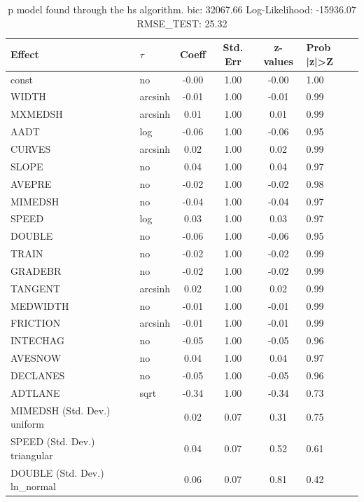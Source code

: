 \begin{table}
	\caption{p model found through the hs algorithm. bic: 32067.66 Log-Likelihood: -15936.07 RMSE_TEST: 25.32}
	\begin{center}
		\begin{tabular}{|l|l|c|c|c|l|}
			\hline
			Effect & $\tau$ & Coeff & Std. Err & z-values & Prob |z|>Z \\
			\hline
			const & no & -0.00 & 1.00 & -0.00 & 1.00 \\
			\hline
			WIDTH & arcsinh & -0.01 & 1.00 & -0.01 & 0.99 \\
			\hline
			MXMEDSH & arcsinh & 0.01 & 1.00 & 0.01 & 0.99 \\
			\hline
			AADT & log & -0.06 & 1.00 & -0.06 & 0.95 \\
			\hline
			CURVES & arcsinh & 0.02 & 1.00 & 0.02 & 0.99 \\
			\hline
			SLOPE & no & 0.04 & 1.00 & 0.04 & 0.97 \\
			\hline
			AVEPRE & no & -0.02 & 1.00 & -0.02 & 0.98 \\
			\hline
			MIMEDSH & no & -0.04 & 1.00 & -0.04 & 0.97 \\
			\hline
			SPEED & log & 0.03 & 1.00 & 0.03 & 0.97 \\
			\hline
			DOUBLE & no & -0.06 & 1.00 & -0.06 & 0.95 \\
			\hline
			TRAIN & no & -0.02 & 1.00 & -0.02 & 0.99 \\
			\hline
			GRADEBR & no & -0.02 & 1.00 & -0.02 & 0.99 \\
			\hline
			TANGENT & arcsinh & 0.02 & 1.00 & 0.02 & 0.99 \\
			\hline
			MEDWIDTH & no & -0.01 & 1.00 & -0.01 & 0.99 \\
			\hline
			FRICTION & arcsinh & -0.01 & 1.00 & -0.01 & 0.99 \\
			\hline
			INTECHAG & no & -0.05 & 1.00 & -0.05 & 0.96 \\
			\hline
			AVESNOW & no & 0.04 & 1.00 & 0.04 & 0.97 \\
			\hline
			DECLANES & no & -0.05 & 1.00 & -0.05 & 0.96 \\
			\hline
			ADTLANE & sqrt & -0.34 & 1.00 & -0.34 & 0.73 \\
			\hline
			MIMEDSH (Std. Dev.) uniform &  & 0.02 & 0.07 & 0.31 & 0.75 \\
			\hline
			SPEED (Std. Dev.) triangular &  & 0.04 & 0.07 & 0.52 & 0.61 \\
			\hline
			DOUBLE (Std. Dev.) ln_normal &  & 0.06 & 0.07 & 0.81 & 0.42 \\

\end{tabular}
\end{center}
\end{table}
